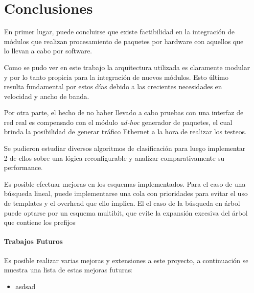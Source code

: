 \chapter{Conclusiones}

En primer lugar, puede concluirse que existe factibilidad en la integración de módulos que realizan procesamiento de paquetes por hardware con aquellos que lo llevan a cabo por software.

Como se pudo ver en este trabajo la arquitectura utilizada es claramente modular y por lo tanto propicia para la integración de nuevos módulos. Esto último resulta fundamental por estos días debido a las crecientes necesidades en velocidad y ancho de banda.

Por otra parte, el hecho de no haber llevado a cabo pruebas con una interfaz de red real es compensado con el módulo \textit{ad-hoc} generador de paquetes, el cual brinda la posibilidad de generar tráfico Ethernet a la hora de realizar los testeos.

Se pudieron estudiar diversos algoritmos de clasificación para luego implementar 2 de ellos sobre una lógica reconfigurable y analizar comparativamente su performance.

Es posible efectuar mejoras en los esquemas implementados. Para el caso de una búsqueda lineal, puede implementarse una cola con prioridades para evitar el uso de templates y el overhead que ello implica. El el caso de la búsqueda en árbol puede optarse por un esquema multibit, que evite la expansión excesiva del árbol que contiene los prefijos 

\subsubsection{Trabajos Futuros}

Es posible realizar varias mejoras y extensiones a este proyecto, a continuación se muestra una lista de estas mejoras futuras:

\begin{itemize}
	\item asdsad
\end{itemize}






